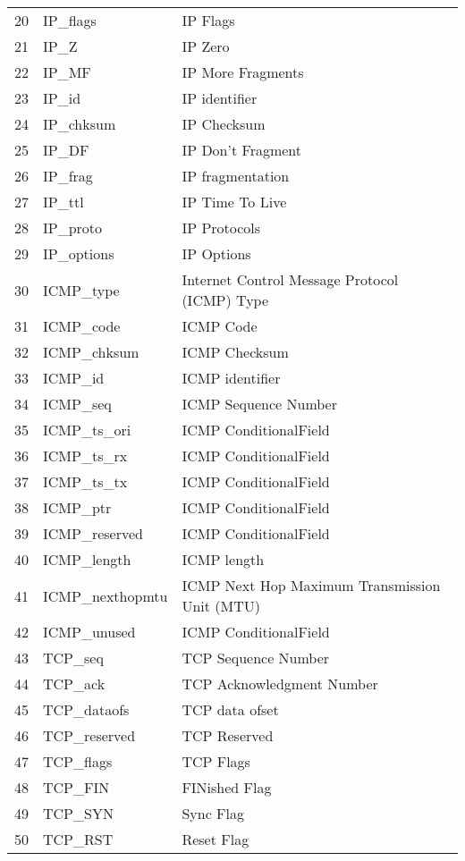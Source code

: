 \documentclass{article}
\begin{document}
\begin{table}[htbp]
{\begin{tabular}{rll}
				20    & IP\_flags & IP Flags \\
				\rowcolor[rgb]{ .851,  .851,  .851} 21    & IP\_Z & IP Zero \\
				22    & IP\_MF & IP More Fragments \\
				\rowcolor[rgb]{ .851,  .851,  .851} 23    & IP\_id & IP identifier \\
				24    & IP\_chksum & IP Checksum \\
				\rowcolor[rgb]{ .851,  .851,  .851} 25    & IP\_DF & IP Don’t Fragment \\
				26    & IP\_frag & IP fragmentation \\
				\rowcolor[rgb]{ .851,  .851,  .851} 27    & IP\_ttl & IP Time To Live \\
				28    & IP\_proto & IP Protocols \\
				\rowcolor[rgb]{ .851,  .851,  .851} 29    & IP\_options & IP Options \\
				30    & ICMP\_type & Internet Control Message Protocol (ICMP) Type \\
				\rowcolor[rgb]{ .851,  .851,  .851} 31    & ICMP\_code & ICMP Code \\
				32    & ICMP\_chksum & ICMP Checksum \\
				\rowcolor[rgb]{ .851,  .851,  .851} 33    & ICMP\_id & ICMP identifier \\
				34    & ICMP\_seq & ICMP Sequence Number \\
				\rowcolor[rgb]{ .851,  .851,  .851} 35    & ICMP\_ts\_ori & ICMP ConditionalField      \\
				36    & ICMP\_ts\_rx & ICMP ConditionalField      \\
				\rowcolor[rgb]{ .851,  .851,  .851} 37    & ICMP\_ts\_tx & ICMP ConditionalField      \\
				38    & ICMP\_ptr & ICMP ConditionalField      \\
				\rowcolor[rgb]{ .851,  .851,  .851} 39    & ICMP\_reserved & ICMP ConditionalField      \\
				40    & ICMP\_length & ICMP  length \\
				\rowcolor[rgb]{ .851,  .851,  .851} 41    & ICMP\_nexthopmtu & ICMP Next Hop Maximum Transmission Unit (MTU) \\
				42    & ICMP\_unused & ICMP ConditionalField      \\
				\rowcolor[rgb]{ .851,  .851,  .851} 43    & TCP\_seq & TCP Sequence Number \\
				44    & TCP\_ack & TCP Acknowledgment Number \\
				\rowcolor[rgb]{ .851,  .851,  .851} 45    & TCP\_dataofs & TCP data ofset \\
				46    & TCP\_reserved & TCP Reserved \\
				\rowcolor[rgb]{ .851,  .851,  .851} 47    & TCP\_flags & TCP Flags \\
				48    & TCP\_FIN & FINished Flag \\
				\rowcolor[rgb]{ .851,  .851,  .851} 49    & TCP\_SYN & Sync Flag \\
				50    & TCP\_RST & Reset Flag \\
				

\end{tabular}}
\end{table}
\end{document}
